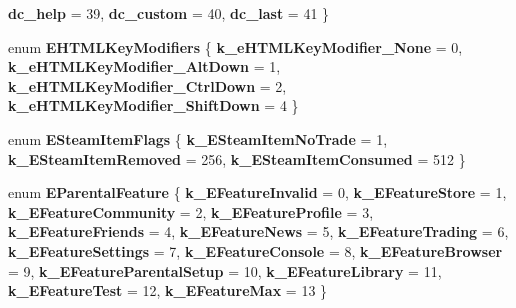 \begin{DoxyCompactItemize}
{\bfseries dc\+\_\+help} = 39, 
\newline
{\bfseries dc\+\_\+custom} = 40, 
{\bfseries dc\+\_\+last} = 41
 \}
\item 
\mbox{\label{namespace_valve_1_1_steamworks_a123428c00807a8caf41e604d625ee806}} 
enum {\bfseries E\+H\+T\+M\+L\+Key\+Modifiers} \{ {\bfseries k\+\_\+e\+H\+T\+M\+L\+Key\+Modifier\+\_\+\+None} = 0, 
{\bfseries k\+\_\+e\+H\+T\+M\+L\+Key\+Modifier\+\_\+\+Alt\+Down} = 1, 
{\bfseries k\+\_\+e\+H\+T\+M\+L\+Key\+Modifier\+\_\+\+Ctrl\+Down} = 2, 
{\bfseries k\+\_\+e\+H\+T\+M\+L\+Key\+Modifier\+\_\+\+Shift\+Down} = 4
 \}
\item 
\mbox{\label{namespace_valve_1_1_steamworks_a40c19ecf80d0aa48b6dd113b3ca44875}} 
enum {\bfseries E\+Steam\+Item\+Flags} \{ {\bfseries k\+\_\+\+E\+Steam\+Item\+No\+Trade} = 1, 
{\bfseries k\+\_\+\+E\+Steam\+Item\+Removed} = 256, 
{\bfseries k\+\_\+\+E\+Steam\+Item\+Consumed} = 512
 \}
\item 
\mbox{\label{namespace_valve_1_1_steamworks_ae5a15aa80e978e1cf94c02eeffd9cbd3}} 
enum {\bfseries E\+Parental\+Feature} \{ \newline
{\bfseries k\+\_\+\+E\+Feature\+Invalid} = 0, 
{\bfseries k\+\_\+\+E\+Feature\+Store} = 1, 
{\bfseries k\+\_\+\+E\+Feature\+Community} = 2, 
{\bfseries k\+\_\+\+E\+Feature\+Profile} = 3, 
\newline
{\bfseries k\+\_\+\+E\+Feature\+Friends} = 4, 
{\bfseries k\+\_\+\+E\+Feature\+News} = 5, 
{\bfseries k\+\_\+\+E\+Feature\+Trading} = 6, 
{\bfseries k\+\_\+\+E\+Feature\+Settings} = 7, 
\newline
{\bfseries k\+\_\+\+E\+Feature\+Console} = 8, 
{\bfseries k\+\_\+\+E\+Feature\+Browser} = 9, 
{\bfseries k\+\_\+\+E\+Feature\+Parental\+Setup} = 10, 
{\bfseries k\+\_\+\+E\+Feature\+Library} = 11, 
\newline
{\bfseries k\+\_\+\+E\+Feature\+Test} = 12, 
{\bfseries k\+\_\+\+E\+Feature\+Max} = 13
 \}
\end{DoxyCompactItemize}
